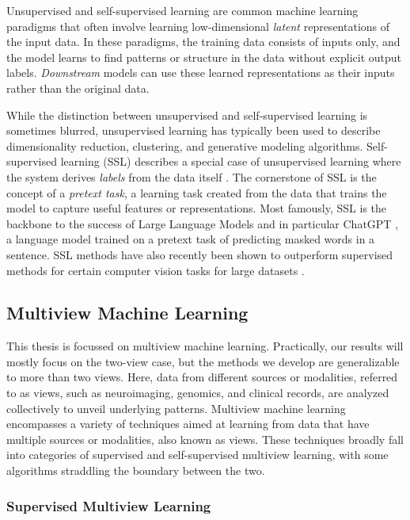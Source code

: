 Unsupervised and self-supervised learning are common machine learning paradigms that often involve learning low-dimensional \textit{latent} \gls{representations} of the input data. In these paradigms, the training data consists of inputs only, and the model learns to find patterns or structure in the data without explicit output labels. \textit{Downstream} models can use these learned \gls{representations} as their inputs rather than the original data.

While the distinction between unsupervised and self-supervised learning is sometimes blurred, unsupervised learning has typically been used to describe dimensionality reduction, clustering, and generative modeling algorithms. Self-supervised learning (SSL) describes a special case of unsupervised learning where the system derives \textit{labels} from the data itself \citep{balestriero2023cookbook}. The cornerstone of SSL is the concept of a \textit{pretext task}, a learning task created from the data that trains the model to capture useful features or representations. Most famously, SSL is the backbone to the success of Large Language Models \citep{vaswani2017attention} and in particular ChatGPT \citep{chatgpt}, a language model trained on a pretext task of predicting masked words in a sentence. SSL methods have also recently been shown to outperform supervised methods for certain computer vision tasks for large datasets \citep{goyal2019scaling}.


\subsection{Multiview Machine Learning}
This thesis is focussed on multiview machine learning.
Practically, our results will mostly focus on the two-view case, but the methods we develop are generalizable to more than two views.
Here, data from different sources or modalities, referred to as \gls{views}, such as neuroimaging, genomics, and clinical records, are analyzed collectively to unveil underlying patterns.
Multiview machine learning encompasses a variety of techniques aimed at learning from data that have multiple sources or modalities, also known as \gls{views}.
These techniques broadly fall into categories of supervised and self-supervised multiview learning, with some algorithms straddling the boundary between the two.

\subsubsection{Supervised Multiview Learning}


